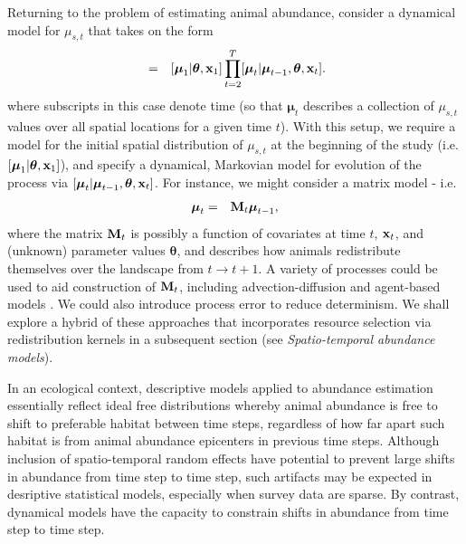 \documentclass[times,mee,doublespace,]{besauth2}
\begin{document}
Returning to the problem of estimating animal abundance, consider a dynamical model for $\mu_{s,t}$ that takes on the form
\begin{eqnarray}
  [\boldsymbol{\mu}|\boldsymbol{\theta},{\bf x}] & = & [\boldsymbol{\mu}_1 | \boldsymbol{\theta},{\bf x}_1] \prod_{t=2}^T [\boldsymbol{\mu}_t | \boldsymbol{\mu}_{t-1},\boldsymbol{\theta},{\bf x}_t].
  \label{eq:mu}
\end{eqnarray}
where subscripts in this case denote time (so that $\boldsymbol{\mu}_t$ describes a collection of $\mu_{s,t}$ values over all spatial locations for a given time $t$).  With this setup, we require a model for the initial spatial distribution of $\mu_{s,t}$ at the beginning of the study (i.e. $[\boldsymbol{\mu}_1 | \boldsymbol{\theta},{\bf x}_1]$), and
specify a dynamical, Markovian model for evolution of the process via $[\boldsymbol{\mu}_t | \boldsymbol{\mu}_{t-1},\boldsymbol{\theta},{\bf x}_t]$.  For instance, we might consider a matrix model - i.e.
\begin{eqnarray}
\boldsymbol{\mu}_t & = & {\bf M}_t \boldsymbol{\mu}_{t-1},
 \label{eq:matrix-mod}
\end{eqnarray}
where the matrix ${\bf M}_t$ is possibly a function of covariates at time $t$, ${\bf x}_t$, and (unknown) parameter values $\boldsymbol{\theta}$, and describes how animals
redistribute themselves over the landscape from $t \rightarrow t+1$.  A variety of processes could be used to aid construction of ${\bf M}_t$, including advection-diffusion \citep{Wikle2003} and agent-based models \citep{HootenWikle2010}.  We could also introduce process error to reduce determinism.  We shall explore a hybrid of these approaches that incorporates resource selection via redistribution kernels in a subsequent section (see {\it Spatio-temporal abundance models}).

In an ecological context, descriptive models applied to abundance estimation essentially reflect ideal free distributions \citep{FretwellLucas1970} whereby animal abundance is free to shift to preferable habitat between time steps, regardless of how far apart such habitat is from animal abundance epicenters in previous time steps.  Although inclusion of spatio-temporal random effects have potential to prevent large shifts in abundance from time step to time step, such artifacts may be expected in desriptive statistical models, especially when survey data are sparse.  By contrast, dynamical models have the capacity to constrain shifts in abundance from time step to time step.
\end{document}
